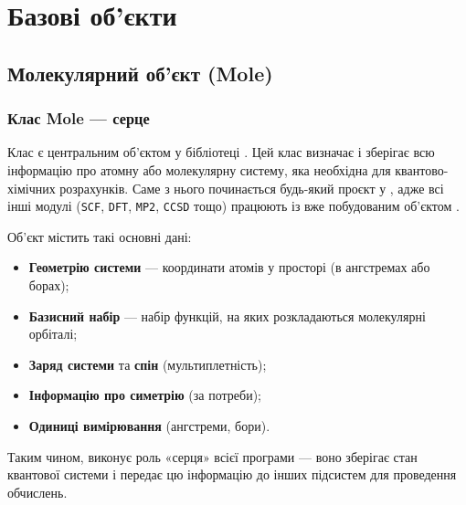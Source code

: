 
\chapter{Базові об'єкти \PySCF}\label{\currfilebase}

\section{Молекулярний об'єкт (Mole)}

\subsection{Клас Mole --- серце \PySCF}

Клас  є центральним об'єктом у бібліотеці \PySCF.
Цей клас визначає і зберігає всю інформацію про атомну або молекулярну систему, яка необхідна для квантово-хімічних розрахунків.
Саме з нього починається будь-який проєкт у \PySCF, адже всі інші модулі (\texttt{SCF}, \texttt{DFT}, \texttt{MP2}, \texttt{CCSD} тощо) працюють із вже побудованим об'єктом .

Об’єкт  містить такі основні дані:
\begin{itemize}
	\item \textbf{Геометрію системи} --- координати атомів у просторі (в ангстремах або борах);
	\item \textbf{Базисний набір} --- набір функцій, на яких розкладаються молекулярні орбіталі;
	\item \textbf{Заряд системи} та \textbf{спін} (мультиплетність);
	\item \textbf{Інформацію про симетрію} (за потреби);
	\item \textbf{Одиниці вимірювання} (ангстреми, бори).
\end{itemize}

Таким чином,  виконує роль «серця» всієї програми --- воно зберігає стан квантової системи і передає цю інформацію до інших підсистем для проведення обчислень.

